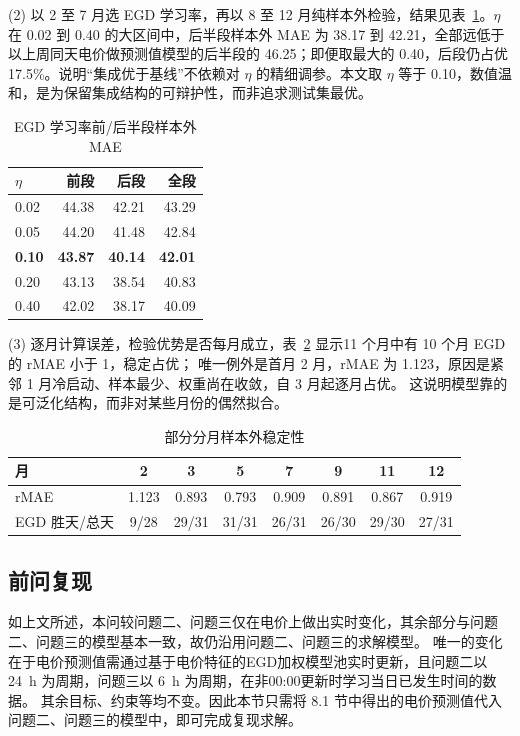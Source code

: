 \documentclass[zihao=-4,a4paper,fontset=none]{ctexart}
\begin{document}
(2) 以 2 至 7 月选 EGD 学习率，再以 8 至 12 月纯样本外检验，结果见表~\ref{tab:p4eta}。$\eta$ 在 0.02 到 0.40 的大区间中，后半段样本外 MAE 为 38.17 到 42.21，全部远低于以上周同天电价做预测值模型的后半段的 46.25；即便取最大的 0.40，后段仍占优 17.5\%。说明“集成优于基线”不依赖对 $\eta$ 的精细调参。本文取 $\eta$ 等于 0.10，数值温和，是为保留集成结构的可辩护性，而非追求测试集最优。



\begin{table}[htbp]
\centering
\caption{EGD 学习率前/后半段样本外 MAE}
{\small
\begin{tabular}{lrrr}
\toprule
$\eta$ & 前段 & 后段 & 全段 \\
\midrule
0.02 & 44.38 & 42.21 & 43.29 \\
0.05 & 44.20 & 41.48 & 42.84 \\
\textbf{0.10} & \textbf{43.87} & \textbf{40.14} & \textbf{42.01} \\
0.20 & 43.13 & 38.54 & 40.83 \\
0.40 & 42.02 & 38.17 & 40.09 \\
\bottomrule
\end{tabular}}
\label{tab:p4eta}
\end{table}

(3) 逐月计算误差，检验优势是否每月成立，表~\ref{tab:p4monthly} 显示11 个月中有 10 个月 EGD 的 rMAE 小于 1，稳定占优；
唯一例外是首月 2 月，rMAE 为 1.123，原因是紧邻 1 月冷启动、样本最少、权重尚在收敛，自 3 月起逐月占优。
这说明模型靠的是可泛化结构，而非对某些月份的偶然拟合。

\begin{table}[htbp]
\centering
\caption{部分分月样本外稳定性}
{\small
\begin{tabular}{lccccccc}
\toprule
月 & 2 & 3 & 5 & 7 & 9 & 11 & 12 \\
\midrule
rMAE & 1.123 & 0.893 & 0.793 & 0.909 & 0.891 & 0.867 & 0.919 \\
EGD 胜天/总天 & 9/28 & 29/31 & 31/31 & 26/31 & 26/30 & 29/30 & 27/31 \\
\bottomrule
\end{tabular}}
\label{tab:p4monthly}
\end{table}

\subsection{前问复现}

如上文所述，本问较问题二、问题三仅在电价上做出实时变化，其余部分与问题二、问题三的模型基本一致，故仍沿用问题二、问题三的求解模型。
唯一的变化在于电价预测值需通过基于电价特征的EGD加权模型池实时更新，且问题二以 24~h 为周期，问题三以 6~h 为周期，在非00:00更新时学习当日已发生时间的数据。
其余目标、约束等均不变。因此本节只需将 8.1 节中得出的电价预测值代入问题二、问题三的模型中，即可完成复现求解。
\end{document}
